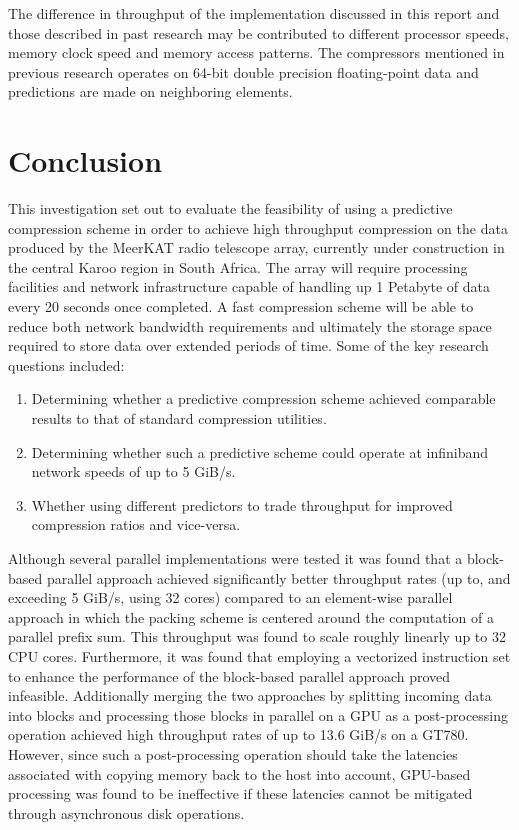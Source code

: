The difference in throughput of the implementation discussed in this report and those described in past research may be contributed to different processor speeds, memory clock speed
and memory access patterns. The compressors mentioned in previous research operates on 64-bit double precision floating-point data and predictions are made on neighboring elements. 
\section{Conclusion}
This investigation set out to evaluate the feasibility of using a predictive compression scheme in order to achieve high throughput compression on the data produced by the MeerKAT radio telescope array, currently under construction
in the central Karoo region in South Africa. The array will require processing facilities and network infrastructure capable of handling up 1 Petabyte of data every 20 seconds once completed. A fast compression scheme will be able
to reduce both network bandwidth requirements and ultimately the storage space required to store data over extended periods of time. Some of the key research questions included:
\begin{enumerate}
 \item Determining whether a predictive compression scheme achieved comparable results to that of standard compression utilities.
 \item Determining whether such a predictive scheme could operate at infiniband network speeds of up to 5 GiB/s.
 \item Whether using different predictors to trade throughput for improved compression ratios and vice-versa.
\end{enumerate}
Although several parallel implementations were tested it was found that a block-based parallel approach achieved significantly better throughput rates (up to, and exceeding 5 GiB/s, using 32 cores) compared to an 
element-wise parallel approach in which the packing scheme is centered around the computation of a parallel prefix sum. This throughput was found to scale roughly linearly up to 32 CPU cores. Furthermore, it was 
found that employing a vectorized instruction set to enhance the performance of the block-based parallel approach proved infeasible. Additionally merging the two approaches by splitting incoming data into blocks 
and processing those blocks in parallel on a GPU as a post-processing operation achieved high throughput rates of up to 13.6 GiB/s on a GT780. However, since such a post-processing operation should take the 
latencies associated with copying memory back to the host into account, GPU-based processing was found to be ineffective if these latencies cannot be mitigated through asynchronous disk operations.

